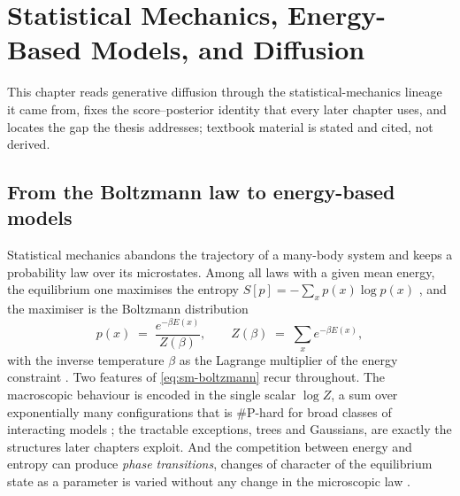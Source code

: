 %

\chapter{Statistical Mechanics, Energy-Based Models, and Diffusion}
\label{ch:statmech}

This chapter reads generative diffusion through the statistical-mechanics
lineage it came from, fixes the score--posterior identity that every later
chapter uses, and locates the gap the thesis addresses; textbook material is
stated and cited, not derived.

\section{From the Boltzmann law to energy-based models}
\label{sec:sm-what}\label{sec:sm-ebm}

Statistical mechanics abandons the trajectory of a many-body system and keeps
a probability law over its microstates. Among all laws with a given mean
energy, the equilibrium one maximises the entropy
$S[p] = -\sum_x p(x)\log p(x)$ \citep{jaynes1957information}, and the
maximiser is the Boltzmann distribution
\begin{equation}
  p(x) \;=\; \frac{e^{-\beta E(x)}}{Z(\beta)},
  \qquad
  Z(\beta) \;=\; \sum_{x} e^{-\beta E(x)},
  \label{eq:sm-boltzmann}
\end{equation}
with the inverse temperature $\beta$ as the Lagrange multiplier of the energy
constraint \citep{landau1980statistical}. Two features of
\eqref{eq:sm-boltzmann} recur throughout. The macroscopic behaviour is encoded
in the single scalar $\log Z$, a sum over exponentially many configurations
that is $\#$P-hard for broad classes of interacting models
\citep{barahona1982computational, jerrum1993polynomial}; the tractable
exceptions, trees and Gaussians, are exactly the structures later chapters
exploit. And the competition between energy and entropy can produce
\emph{phase transitions}, changes of character of the equilibrium state as a
parameter is varied without any change in the microscopic law
\citep{ising1925beitrag, onsager1944crystal}.

